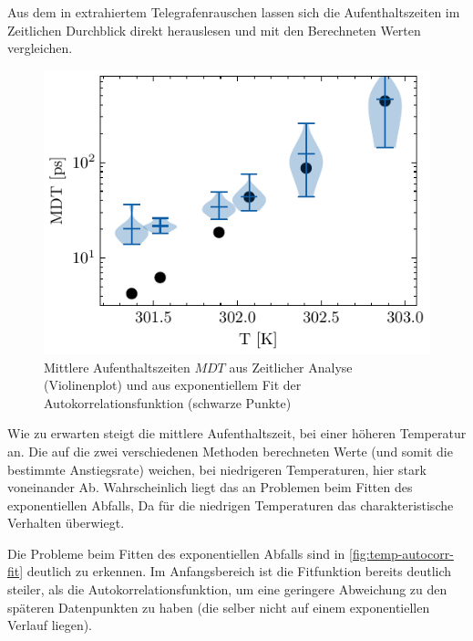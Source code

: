 \documentclass[main.tex]{subfiles}
\begin{document}

Aus dem in extrahiertem Telegrafenrauschen lassen sich die Aufenthaltszeiten im Zeitlichen Durchblick direkt herauslesen und mit den Berechneten Werten vergleichen. 

\begin{figure}[H]
    \centering
    \includegraphics{bilder/plots/temp_comparison/mean_dwell_time_comparison.pdf}
    \caption{Mittlere Aufenthaltszeiten $MDT$ aus Zeitlicher Analyse (Violinenplot) und aus exponentiellem Fit der Autokorrelationsfunktion (schwarze Punkte) }\label{fig:temp-mdt-comp}
\end{figure}

Wie zu erwarten steigt die mittlere Aufenthaltszeit, bei einer höheren Temperatur an. Die auf die zwei verschiedenen Methoden berechneten Werte (und somit die bestimmte Anstiegsrate) weichen, bei niedrigeren Temperaturen, hier stark voneinander Ab. 
Wahrscheinlich liegt das an Problemen beim Fitten des exponentiellen Abfalls, Da für die niedrigen Temperaturen das charakteristische Verhalten überwiegt.


Die Probleme beim Fitten des exponentiellen Abfalls sind in \cref{fig:temp-autocorr-fit} deutlich zu erkennen. Im Anfangsbereich ist die Fitfunktion bereits deutlich steiler, als die Autokorrelationsfunktion, um eine geringere Abweichung zu den späteren Datenpunkten zu haben (die selber nicht auf einem exponentiellen Verlauf liegen).
\end{document}
